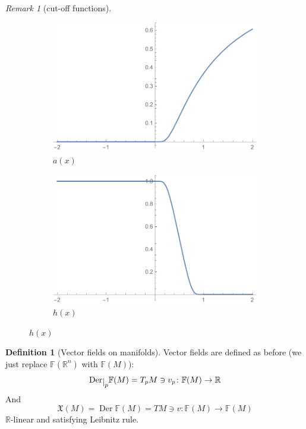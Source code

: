 \documentclass[a4paper,11pt,titlepage, article, oneside]{memoir}
\numberwithin{equation}{section}
\theoremstyle{definition}
\newtheorem{definition}[theorem]{Definition}
\theoremstyle{remark}
\newtheorem{remark}[theorem]{Remark}
\DeclareMathOperator{\Der}{Der}
\newcommand{\rfield}{\mathbb{R}}
\newcommand{\restrict}[2]{{#1}\raisebox{-.5ex}{$|$}_{#2}}
\begin{document}
\begin{remarkbox}
\begin{remark}[cut-off functions]
  \begin{figure}[H]
  \centering
  \begin{subfigure}{.5\textwidth}
    \centering
    \includegraphics[width=.9\linewidth]{Images/cutoff_1.pdf}
    \caption{$a(x)$}
  \end{subfigure}%
  \begin{subfigure}{.5\textwidth}
    \centering
    \includegraphics[width=.9\linewidth]{Images/cutoff_2}
    \caption{$h(x)$}
  \end{subfigure}
  \end{figure}
\end{remark}\end{remarkbox}

\begin{definition}[Vector fields on manifolds]
  Vector fields are defined as before (we just replace $\mathbb{F}(\rfield^n)$ with $\mathbb{F}(M)$):
  $$\restrict{\Der}{p} \mathbb{F}(M) = T_p M \ni v_p \colon \mathbb{F}(M) \rightarrow \rfield$$
  And
  $$\mathfrak{X}(M) = \Der \mathbb{F}(M) = TM \ni v \colon \mathbb{F}(M) \rightarrow \mathbb{F}(M)$$
  $\rfield$-linear and satisfying Leibnitz rule.
\end{definition}
\end{document}
